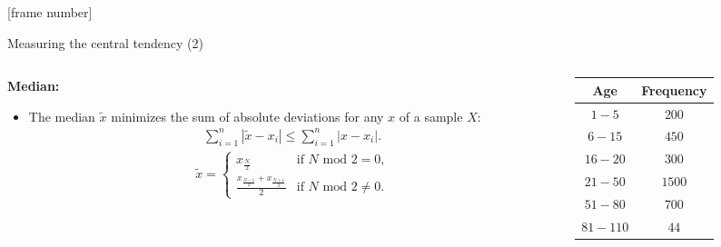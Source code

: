 \documentclass[aspectratio=169,t]{beamer}
\begin{document}
  {
    [frame number]
    \begin{frame}{Measuring the central tendency (2)}
      \begin{columns}
        \begin{column}{0.6\textwidth}
          \textbf{Median:}
          \begin{itemize}[noitemsep]
            \item The median $\tilde{x}$ minimizes the sum of absolute deviations for any $x$ of a sample $X$:
            \begin{align}
              \sum_{i=1}^{n} |\tilde{x}-x_i| \leq \sum_{i=1}^{n} |x-x_i|.
            \end{align}
            \begin{align}
              \tilde{x} = \begin{cases}
              x_{\frac{N}{2}} & \text{if $N$ mod $2 = 0$,} \\
              \frac{x_{\frac{N-1}{2}}+x_{\frac{N+1}{2}}}{2} & \text{if $N$ mod $2 \neq 0$.}
            \end{cases}
            \end{align}
          \end{itemize}
        \end{column}
        \begin{column}{0.3\textwidth}  %
        \begin{table}
        \begin{tabular}{|c|c|}
          Age & Frequency \\ \hline
          $1-5$ & $200$ \\
          $6-15$ & $450$ \\
          $16-20$ & $300$ \\
          $21-50$ & $1500$ \\
          $51-80$ & $700$ \\
          $81-110$ & $44$
        \end{tabular}\\[0.5cm]
        \end{table}
        \end{column}
      \end{columns}
    \end{frame}
  }
\end{document}
